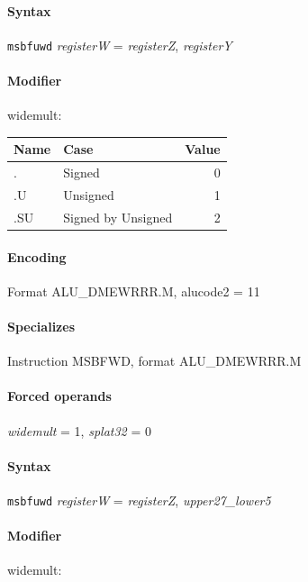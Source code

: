 {\paragraph{Syntax} \texttt{msbfuwd} \emph{registerW} = \emph{registerZ}, \emph{registerY}

\paragraph{Modifier} \textsf{widemult}:\\

\noindent \begin{tabular}{|l|l|r|} \hline
\bf{Name} & \bf{Case} & \bf{Value} \\ \hline
. & Signed & 0 \\
.U & Unsigned & 1 \\
.SU & Signed by Unsigned & 2 \\
\hline \end{tabular}

\paragraph{Encoding} Format \textsf{ALU\_DMEWRRR.M, alucode2 = 11}\\



\paragraph{Specializes} Instruction MSBFWD, format ALU\_DMEWRRR.M

\paragraph{Forced operands} \emph{widemult} = 1, \emph{splat32} = 0

\paragraph{Syntax} \texttt{msbfuwd} \emph{registerW} = \emph{registerZ}, \emph{upper27\_lower5}

\paragraph{Modifier} \textsf{widemult}:\\

}
